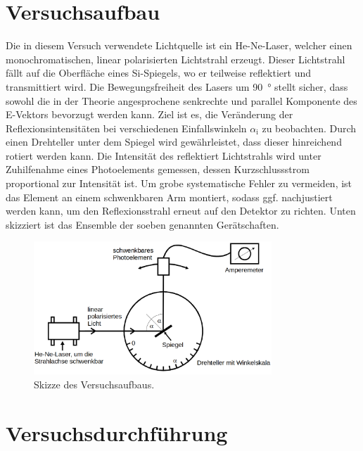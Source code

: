 %

%

\section{Versuchsaufbau}
\label{sec:Versuchsaufbau}

Die in diesem Versuch verwendete Lichtquelle ist ein He-Ne-Laser, welcher einen monochromatischen, linear polarisierten Lichtstrahl erzeugt. Dieser Lichtstrahl 
fällt auf die Oberfläche eines Si-Spiegels, wo er teilweise reflektiert und transmittiert wird. Die Bewegungsfreiheit des Lasers um \qty{90}{\degree} stellt 
sicher, dass sowohl die in der Theorie angesprochene senkrechte und parallel Komponente des E-Vektors bevorzugt werden kann. Ziel ist es, die Veränderung der 
Reflexionsintensitäten bei verschiedenen Einfallswinkeln $\alpha_\text{i}$ zu beobachten. Durch einen Drehteller unter dem Spiegel wird gewährleistet, dass 
dieser hinreichend rotiert werden kann. Die Intensität des reflektiert Lichtstrahls wird unter Zuhilfenahme eines Photoelements gemessen, dessen Kurzschlussstrom 
proportional zur Intensität ist. Um grobe systematische Fehler zu vermeiden, ist das Element an einem schwenkbaren Arm montiert, sodass ggf. nachjustiert werden 
kann, um den Reflexionsstrahl erneut auf den Detektor zu richten. Unten skizziert ist das Ensemble der soeben genannten Gerätschaften.

\begin{figure}
    \centering
    \includegraphics[height=5cm]{content/Aufbau.png}
    \caption{Skizze des Versuchsaufbaus\cite{Versuchsanleitung_v407}.}
    \label{fig:Versuchsaufbau}
\end{figure}

\section{Versuchsdurchführung}
\label{sec:Durchfuehrung}

